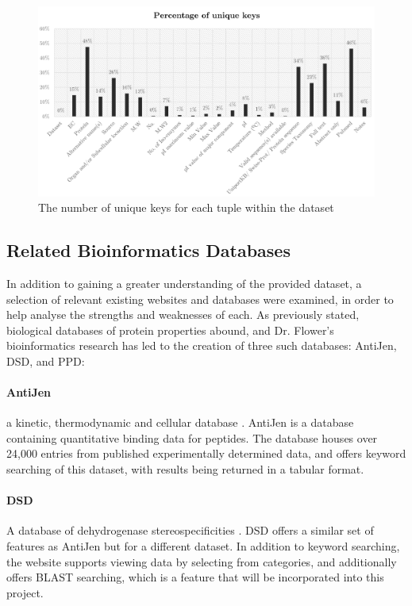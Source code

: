 \begin{figure}[H]
\centering
\includegraphics{assets/chart-dataset-unique.png}
\caption{The number of unique keys for each tuple within the dataset}
\label{fig:chart-dataset-unique}
\end{figure}

\newpage
\subsection{Related Bioinformatics Databases}
In addition to gaining a greater understanding of the provided dataset, a
selection of relevant existing websites and databases were examined, in order to
help analyse the strengths and weaknesses of each. As previously stated,
biological databases of protein properties abound, and Dr. Flower's
bioinformatics research has led to the creation of three such databases:
AntiJen, DSD, and PPD:

\paragraph{AntiJen} a kinetic, thermodynamic and cellular database
\cite{DDG1999}. AntiJen is a database containing quantitative binding data for
peptides. The database houses over 24,000 entries from published experimentally
determined data, and offers keyword searching of this dataset, with results
being returned in a tabular format.

\paragraph{DSD} A database of dehydrogenase stereospecificities
\cite{DDGND}. DSD offers a similar set of features as AntiJen but for a
different dataset. In addition to keyword searching, the website supports
viewing data by selecting from categories, and additionally offers BLAST
searching, which is a feature that will be incorporated into this project.

